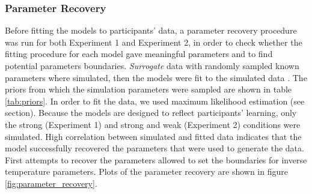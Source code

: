 \documentclass[a4paper,12pt]{article}
\begin{document}
\subsubsection{Parameter Recovery} Before fitting the models to participants' data, a parameter recovery procedure was run for both Experiment 1 and Experiment 2, in order to check whether the fitting procedure for each model gave meaningful parameters and to find potential parameters boundaries. \textit{Surrogate} data with randomly sampled known parameters where simulated, then the models were fit to the simulated data \citep[see][]{Wilson2019a}. The priors from which the simulation parameters were sampled are shown in table \ref{tab:priors}. In order to fit the data, we used maximum likelihood estimation (see section). Because the models are designed to reflect participants' learning, only the strong (Experiment 1) and strong and weak (Experiment 2) conditions were simulated. High correlation between simulated and fitted data indicates that the model successfully recovered the parameters that were used to generate the data. First attempts to recover the parameters allowed to set the boundaries for inverse temperature parameters. Plots of the parameter recovery are shown in figure \ref{fig:parameter_recovery}.




\begin{table} 
    \centering 
    \caption{Priors for the parameters}
    \label{tab:priors}
    \end{table}
\end{document}
